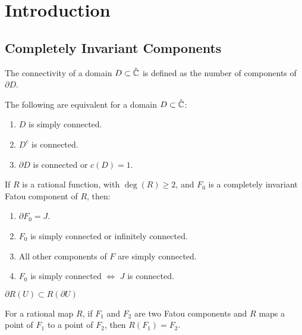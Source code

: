 \chapter{Introduction}

\section{Completely Invariant Components}

\begin{definition}[Connectivity]
	The connectivity of a domain \( D \subset \hat{\mathbb{C}} \) is defined as the number
	of components of \( \partial D \).
\end{definition}

\begin{theorem}\label{thm1.1}
	The following are equivalent for a domain \( D\subset \hat{\mathbb{C}} \):
	\begin{enumerate}
		\item \( D \) is simply connected.
		\item \( D^c \) is connected.
		\item \( \partial D \) is connected or \( c(D)=1 \).
	\end{enumerate}
\end{theorem}

\begin{theorem}\label{thm1.2}
	If \( R \) is a rational function, with \( \deg(R)\ge 2 \), and \( F_0 \) is
	a completely invariant Fatou component of \( R \), then:
	\begin{enumerate}
		\item \( \partial F_0=J \).
		\item \( F_0 \) is simply connected or infinitely connected.
		\item All other components of \( F \) are simply connected.
		\item \( F_0 \) is simply connected \( \iff \) \( J \) is connected.
	\end{enumerate}
\end{theorem}

\begin{theorem}\label{thm1.3}
\( \partial R(U) \subset R(\partial U) \)
\end{theorem}

\begin{lemma}\label{lem1.1}
	For a rational map \( R \), if \( F_1 \) and \( F_2 \) are two Fatou components and \( R \)
	maps a point of \( F_1 \) to a point of \( F_2 \), then \( R(F_1)=F_2 \).
\end{lemma}

